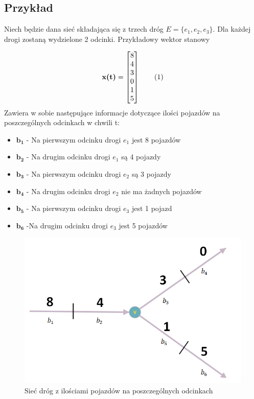 \documentclass[12pt]{book}
\theoremstyle{plain}
\newcommand\addtag{\refstepcounter{equation}
\renewcommand{\labelenumii}{\theenumii}
\renewcommand{\theenumii}{\theenumi.\arabic{enumii}.}
\tag{\theequation}}
\begin{document}
\subsection{Przykład} \label{subsec:wektor_stanowy_siec_przyklad}
Niech będzie dana sieć składająca się z trzech dróg $E=\{e_1,e_2,e_3\}$. Dla każdej drogi zostaną wydzielone 2 odcinki. Przykładowy wektor stanowy
\def \xzero {\begin{bmatrix}
		8 \\ 4 \\ 3 \\ 0 \\ 1 \\ 5
\end{bmatrix}}

\[\textbf{x(t)}=\xzero \addtag \]
Zawiera w sobie następujące informacje dotyczące ilości pojazdów na poszczególnych odcinkach w chwili t:
\begin{itemize}
	\item $\boldsymbol{b_1}$ - Na pierwszym odcinku drogi $e_1$ jest 8 pojazdów
	\item $\boldsymbol{b_2}$ - Na drugim odcinku drogi $e_1$ są 4 pojazdy 
	\item $\boldsymbol{b_3}$ - Na pierwszym odcinku drogi $e_2$ są 3 pojazdy 
	\item $\boldsymbol{b_4}$ - Na drugim odcinku drogi $e_2$ nie ma żadnych pojazdów 
	\item $\boldsymbol{b_5}$ - Na pierwszym odcinku drogi $e_3$ jest 1 pojazd
	\item $\boldsymbol{b_6}$ -Na drugim odcinku drogi $e_3$ jest 5 pojazdów
\end{itemize}

\begin{figure}[H]
	\centering
	\includegraphics[width=14cm]{3_single_road}
	\caption{Sieć dróg z ilościami pojazdów na poszczególnych odcinkach}
	\label{fig:3_single_road}
\end{figure}
\end{document}
